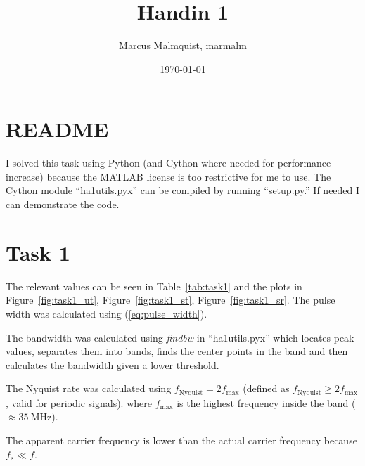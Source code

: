 \documentclass[12pt,a4paper]{article}
\title{Handin 1}
\author{Marcus Malmquist, marmalm}
\date{\today}
\begin{document}
\maketitle

\section{README}
I solved this task using Python (and Cython where needed for performance increase) because the MATLAB license is too restrictive for me to use. The Cython module ``ha1utils.pyx'' can be compiled by running ``setup.py.'' If needed I can demonstrate the code.

\section{Task 1}\label{sec:1}
The relevant values can be seen in Table~\ref{tab:task1} and the plots in Figure~\ref{fig:task1_ut}, Figure~\ref{fig:task1_st}, Figure~\ref{fig:task1_sr}.
The pulse width was calculated using (\ref{eq:pulse_width}).

The bandwidth was calculated using \textit{findbw} in ``ha1utils.pyx'' which locates peak values, separates them into bands, finds the center points in the band and then calculates the bandwidth given a lower threshold.

The Nyquist rate was calculated using $f_\text{Nyquist}=2f_\text{max}$ (defined as $f_\text{Nyquist}\geq 2f_\text{max}$, valid for periodic signals). where $f_\text{max}$ is the highest frequency inside the band ($\approx \SI{35}{\mega\hertz}$).

The apparent carrier frequency is lower than the actual carrier frequency because $f_s\ll f$.
\end{document}
